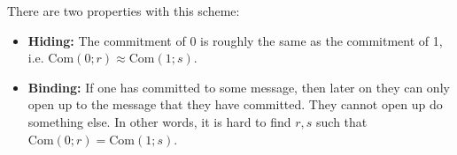There are two properties with this scheme:
\begin{itemize}
    \item \textbf{Hiding:} The commitment of 0 is roughly the same as the commitment of 1, i.e. $\text{Com}(0; r) \approx \text{Com}(1; s)$.
    \item \textbf{Binding:} If one has committed to some message, then later on they can only open up to the message that they have committed. They cannot open up do something else. In other words, it is hard to find $r, s$ such that $\text{Com}(0;r) = \text{Com}(1;s)$.
\end{itemize}